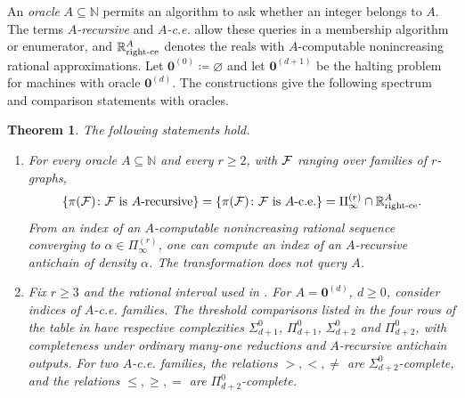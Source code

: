 \documentclass[10pt]{article}
\numberwithin{equation}{section}
\newtheorem{theorem}{Theorem}[section]
\theoremstyle{definition}
\newcommand{\zero}{\mathbf 0}\newcommand{\one}{\mathbf 1}
\begin{document}
An \emph{oracle} $A\subseteq\mathbb N$ permits an algorithm to ask whether an integer belongs to $A$. The terms \emph{$A$-recursive} and \emph{$A$-c.e.} allow these queries in a membership algorithm or enumerator, and $\mathbb R^A_{\rm right\text{-}ce}$ denotes the reals with $A$-computable nonincreasing rational approximations. Let $\zero^{(0)}\coloneqq\varnothing$ and let $\zero^{(d+1)}$ be the halting problem for machines with oracle $\zero^{(d)}$. The constructions give the following spectrum and comparison statements with oracles.

\begin{theorem}\label{thm:oracles}
The following statements hold.
\begin{enumerate}
\item For every oracle $A\subseteq\mathbb N$ and every $r\ge2$, with $\mathcal F$ ranging over families of $r$-graphs,
\[
 \{\pi(\mathcal F)\colon \mathcal F\text{ is }A\text{-recursive}\}
 =\{\pi(\mathcal F)\colon \mathcal F\text{ is }A\text{-c.e.}\}
 =\Pi_\infty^{(r)}\cap\mathbb R^A_{\rm right\text{-}ce}.
\]
From an index of an $A$-computable nonincreasing rational sequence converging to $\alpha\in\Pi_\infty^{(r)}$, one can compute an index of an $A$-recursive antichain of density $\alpha$. The transformation does not query $A$.
\item Fix $r\ge3$ and the rational interval used in . For $A=\zero^{(d)}$, $d\ge0$, consider indices of $A$-c.e. families. The threshold comparisons listed in the four rows of the table in  have respective complexities $\Sigma^0_{d+1}$, $\Pi^0_{d+1}$, $\Sigma^0_{d+2}$ and $\Pi^0_{d+2}$, with completeness under ordinary many-one reductions and $A$-recursive antichain outputs. For two $A$-c.e. families, the relations $>,<,\ne$ are $\Sigma^0_{d+2}$-complete, and the relations $\le,\ge,=$ are $\Pi^0_{d+2}$-complete.
\end{enumerate}
\end{theorem}
\end{document}
